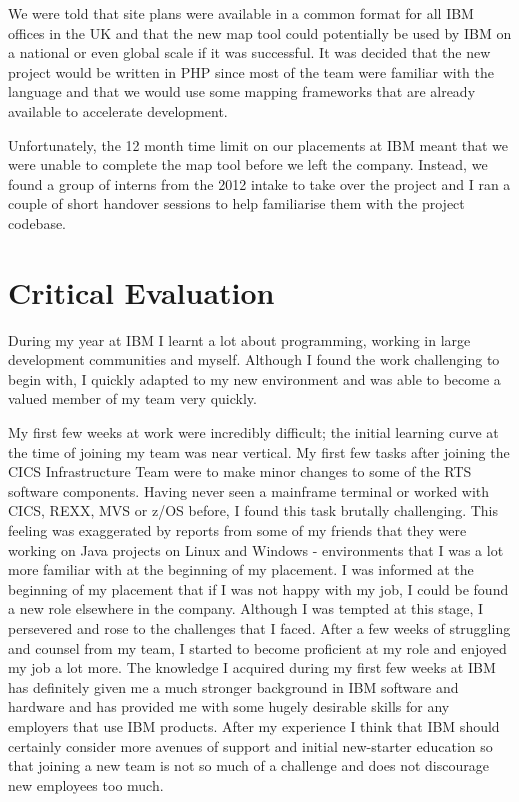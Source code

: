 \documentclass[12pt,a4paper]{article}
\begin{document}
We were told that site plans were available in a common format for all IBM
offices in the UK and that the new map tool could potentially be used by IBM on
a national or even global scale if it was successful. It was decided that the
new project would be written in PHP since most of the team were familiar with
the language and that we would use some mapping frameworks that are already
available to accelerate development.

Unfortunately, the 12 month time limit on our placements at IBM meant that we
were unable to complete the map tool before we left the company. Instead, we
found a group of interns from the 2012 intake to take over the project and I
ran a couple of short handover sessions to help familiarise them with the 
project codebase.

\section{Critical Evaluation}

During my year at IBM I learnt a lot about programming, working in large 
development communities and myself. Although I found the work challenging
to begin with, I quickly adapted to my new environment and was able to  
become a valued member of my team very quickly.

My first few weeks at work were incredibly difficult; the initial learning
curve at the time of joining my team was near vertical. My first few tasks
after joining the CICS Infrastructure Team were to make minor changes to 
some of the RTS software components. Having never seen a mainframe terminal
or worked with CICS, REXX, MVS or z/OS before, I found this task brutally 
challenging. This feeling was exaggerated by reports from some of my friends
that they were working on Java projects on Linux and Windows - environments
that I was a lot more familiar with at the beginning of my placement. I was
informed at the beginning of my placement that if I was not happy with my 
job, I could be found a new role elsewhere in the company. Although I was
tempted at this stage, I persevered and rose to the challenges that I faced.
After a few weeks of struggling and counsel from my team, I started to 
become proficient at my role and enjoyed my job a lot more. The knowledge I
acquired during my first few weeks at IBM  has definitely given me a much
stronger background in IBM software and hardware and has provided me with 
some hugely desirable skills for any employers that use IBM products. After
my experience I think that IBM should certainly consider more avenues of 
support and initial new-starter education so that joining a new team is not
so much of a challenge and does not discourage new employees too much.
\end{document}
